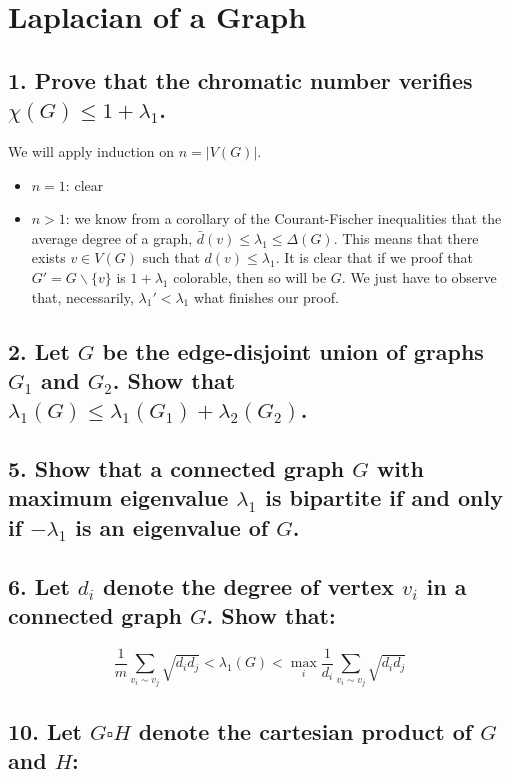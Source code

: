 \section{Laplacian of a Graph}

\subsection[Laplacian - 1]{1. Prove that the chromatic number verifies $\chi(G) \leq 1 + \lambda_1$.}

We will apply induction on $n = |V(G)|$.
\begin{itemize}
    \item $n = 1$: clear
    \item $n > 1$:
        we know from a corollary of the Courant-Fischer inequalities that the average degree of a graph, $\bar{d}(v) \leq \lambda_1 \leq \Delta(G)$.
        This means that there exists $v \in V(G)$ such that $d(v) \leq \lambda_1$.
        It is clear that if we proof that $G' = G \backslash \{ v \}$ is $1 + \lambda_1$ colorable, then so will be $G$.
        We just have to observe that, necessarily, $\lambda_1' < \lambda_1$ what finishes our proof.
\end{itemize}

\subsection[Laplacian - 2]{2. Let $G$ be the edge-disjoint union of graphs $G_1$ and $G_2$. Show that $\lambda_1(G) \leq \lambda_1(G_1) + \lambda_2(G_2)$.}

\subsection[Laplacian - 5]{5. Show that a connected graph $G$ with maximum eigenvalue $\lambda_1$ is bipartite if and only if $-\lambda_1$ is an eigenvalue of $G$.}

\subsection[Laplacian - 6]{6. Let $d_i$ denote the degree of vertex $v_i$ in a connected graph $G$. Show that:}
$$\frac{1}{m} \sum_{v_i \sim v_j} \sqrt{d_i d_j} < \lambda_1(G) < \max_i \frac{1}{d_i} \sum_{v_i \sim v_j} \sqrt{d_i d_j}$$

\subsection[Laplacian - 10]{10. Let $G \square H$ denote the cartesian product of $G$ and $H$:}


